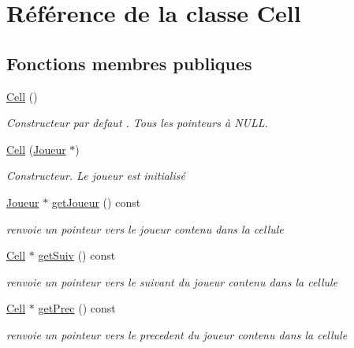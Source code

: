 \hypertarget{class_cell}{\section{\-Référence de la classe \-Cell}
\label{class_cell}
}
\subsection*{\-Fonctions membres publiques}
\begin{DoxyCompactItemize}
\item 
\hypertarget{class_cell_a394510643e8664cf12b5efaf5cb99f71}{\hyperlink{class_cell_a394510643e8664cf12b5efaf5cb99f71}{\-Cell} ()}\label{class_cell_a394510643e8664cf12b5efaf5cb99f71}

\begin{DoxyCompactList}\small\item\em \-Constructeur par defaut . \-Tous les pointeurs à \-N\-U\-L\-L. \end{DoxyCompactList}\item 
\hyperlink{class_cell_a3ece9c0b7e86315dd22ecb51c80bb781}{\-Cell} (\hyperlink{class_joueur}{\-Joueur} $\ast$)
\begin{DoxyCompactList}\small\item\em \-Constructeur. \-Le joueur est initialisé \end{DoxyCompactList}\item 
\hyperlink{class_joueur}{\-Joueur} $\ast$ \hyperlink{class_cell_a2d28662bf2f0347378402022e87428cf}{get\-Joueur} () const 
\begin{DoxyCompactList}\small\item\em renvoie un pointeur vers le joueur contenu dans la cellule \end{DoxyCompactList}\item 
\hyperlink{class_cell}{\-Cell} $\ast$ \hyperlink{class_cell_a4386393b73e6235fd94735e21c6f551c}{get\-Suiv} () const 
\begin{DoxyCompactList}\small\item\em renvoie un pointeur vers le suivant du joueur contenu dans la cellule \end{DoxyCompactList}\item 
\hyperlink{class_cell}{\-Cell} $\ast$ \hyperlink{class_cell_afe67fb42e896d2f67b2893e8099a8037}{get\-Prec} () const 
\begin{DoxyCompactList}\small\item\em renvoie un pointeur vers le precedent du joueur contenu dans la cellule \end{DoxyCompactList}\item 

\end{DoxyCompactItemize}
